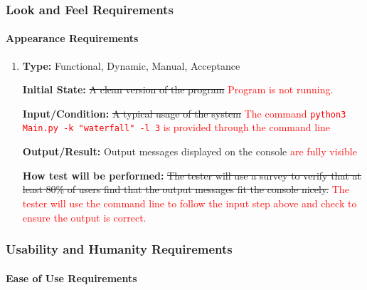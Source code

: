 \documentclass[12pt, titlepage]{article}
\begin{document}
\subsubsection{Look and Feel Requirements}
\label{LaFReqs}
		
\paragraph{Appearance Requirements}

\begin{enumerate}[label=NFR-AR\arabic*:, wide=0pt, leftmargin=*]

\item \phantom{empty}

\textbf{Type:} Functional, Dynamic, Manual, Acceptance
					
\textbf{Initial State:} \sout{A clean version of the program} \textcolor{red}{Program is not running.}
					
\textbf{Input/Condition:} \sout{A typical usage of the system} 
\textcolor{red}{\textcolor{red}{The command \texttt{python3 Main.py -k "waterfall" -l 3} is provided through the command line}}
					
\textbf{Output/Result:} Output messages displayed on the console \textcolor{red}{are fully visible}
					
\textbf{How test will be performed:} \sout{The tester will use a survey to verify that at least 80\% of users 
find that the output messages fit the console nicely.}
\textcolor{red}{The tester will use the command line to follow the input step above and check to ensure the output is correct.}

\end{enumerate}

\subsubsection{Usability and Humanity Requirements}
\label{UaHReqs}
		
\paragraph{Ease of Use Requirements}
\end{document}

